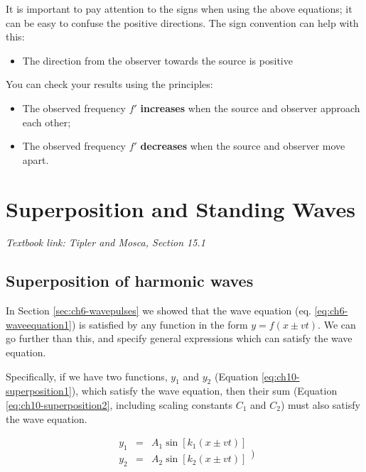 \documentclass[
]{book}
\providecommand{\tightlist}{%
  \setlength{\itemsep}{0pt}\setlength{\parskip}{0pt}}
\begin{document}
It is important to pay attention to the signs when using the above equations; it can be easy to confuse the positive directions. The sign convention can help with this:

\begin{itemize}
\tightlist
\item
  The direction from the observer towards the source is positive
\end{itemize}

You can check your results using the principles:

\begin{itemize}
\tightlist
\item
  The observed frequency \(f'\) \textbf{increases} when the source and observer approach each other;
\item
  The observed frequency \(f'\) \textbf{decreases} when the source and observer move apart.
\end{itemize}

\hypertarget{sec:ch10-superposition}{%
\chapter{Superposition and Standing Waves}\label{sec:ch10-superposition}}

\emph{Textbook link: Tipler and Mosca, Section 15.1}

\hypertarget{sec:ch10-superposharmonic1}{%
\section{Superposition of harmonic waves}\label{sec:ch10-superposharmonic1}}

In Section \ref{sec:ch6-wavepulses} we showed that the wave equation (eq. \eqref{eq:ch6-waveequation1}) is satisfied by any function in the form \(y = f(x \pm vt)\). We can go further than this, and specify general expressions which can satisfy the wave equation.

Specifically, if we have two functions, \(y_1\) and \(y_2\) (Equation \eqref{eq:ch10-superposition1}), which satisfy the wave equation, then their sum (Equation \eqref{eq:ch10-superposition2}, including scaling constants \(C_1\) and \(C_2\)) must also satisfy the wave equation.

\begin{equation}
\begin{array}{rcl}
y_1 &=& A_1 \sin\left[k_1(x \pm vt)\right] \\
y_2 &=& A_2 \sin\left[k_2(x \pm vt)\right] \\
\end{array}
\label{eq:ch10-superposition1})
\end{equation}
\end{document}
